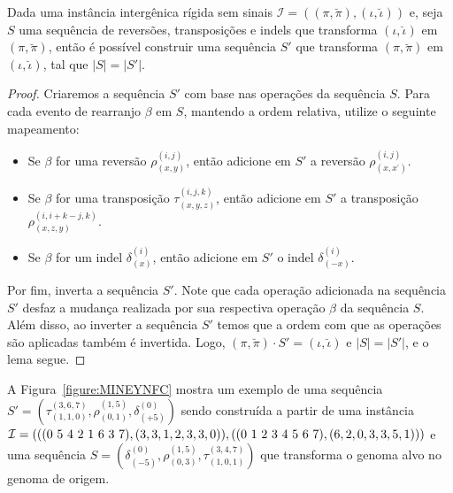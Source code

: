 \begin{lemma}\label{lemma:UWWIFTBQ}
Dada uma instância intergênica rígida sem sinais $\mathcal{I} = ((\pi,\breve\pi),(\iota,\breve\iota))$ e, seja $S$ uma sequência de reversões, transposições e indels que transforma $(\iota,\breve\iota)$ em $(\pi,\breve\pi)$, então é possível construir uma sequência $S'$ que transforma $(\pi,\breve\pi)$ em $(\iota,\breve\iota)$, tal que $|S| = |S'|$.
\end{lemma}
\begin{proof}
Criaremos a sequência $S'$ com base nas operações da sequência $S$. Para cada evento de rearranjo $\beta$ em $S$, mantendo a ordem relativa, utilize o seguinte mapeamento:
\begin{itemize}
  \item Se $\beta$ for uma reversão $\rho^{(i,j)}_{(x,y)}$, então adicione em $S'$ a reversão $\rho^{(i,j)}_{(x,x^{\prime})}$.
  \item Se $\beta$ for uma transposição $\tau^{(i,j,k)}_{(x,y,z)}$, então adicione em $S'$ a transposição $\rho^{(i,i+k-j,k)}_{(x,z,y)}$.
  \item Se $\beta$ for um indel $\delta^{(i)}_{(x)}$, então adicione em $S'$ o indel $\delta^{(i)}_{(-x)}$. 
\end{itemize}  
Por fim, inverta a sequência $S'$. Note que cada operação adicionada na sequência $S'$ desfaz a mudança realizada por sua respectiva operação $\beta$ da sequência $S$. Além disso, ao inverter a sequência $S'$ temos que a ordem com que as operações são aplicadas também é invertida. Logo, $(\pi,\breve\pi) \cdot S' = (\iota,\breve\iota)$ e $|S| = |S'|$, e o lema segue.
\end{proof}

A Figura~\ref{figure:MINEYNFC} mostra um exemplo de uma sequência $S'=(\tau^{(3,6,7)}_{(1,1,0)},\rho^{(1,5)}_{(0,1)},\delta^{(0)}_{({+5})})$ sendo construída a partir de uma instância $\mathcal{I} = (((0~5~4~2~1~6~3~7),(3,3,1,2,3,3,0)),((0~1~2~\break3~4~5~6~7),(6,2,0,3,3,5,1)))$ e uma sequência $S=(\delta^{(0)}_{({-5})},\rho^{(1,5)}_{(0,3)},\tau^{(3,4,7)}_{(1,0,1)})$ que transforma o genoma alvo no genoma de origem.



